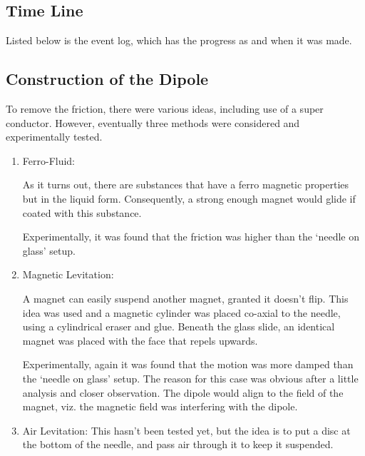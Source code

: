 	\subsection{Time Line}
		Listed below is the event log, which has the progress as and when it was made.
		
	
	\subsection{Construction of the Dipole}
		To remove the friction, there were various ideas, including use of a super conductor. However, eventually three methods were considered and experimentally tested.
		\begin{enumerate}
			\item Ferro-Fluid: 
					\par
					As it turns out, there are substances that have a ferro magnetic properties but in the liquid form. Consequently, a strong enough magnet would glide if coated with this substance.
					\par
					Experimentally, it was found that the friction was higher than the `needle on glass' setup. 
			\item Magnetic Levitation:
					\par
					A magnet can easily suspend another magnet, granted it doesn't flip. This idea was used and a magnetic cylinder was placed co-axial to the needle, using a cylindrical eraser and glue. Beneath the glass slide, an identical magnet was placed with the face that repels upwards.
					\par
					Experimentally, again it was found that the motion was more damped than the `needle on glass' setup. The reason for this case was obvious after a little analysis and closer observation. The dipole would align to the field of the magnet, viz. the magnetic field was interfering with the dipole.
			\item Air Levitation:
					This hasn't been tested yet, but the idea is to put a disc at the bottom of the needle, and pass air through it to keep it suspended.
		\end{enumerate}
